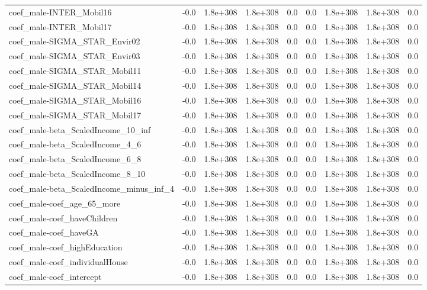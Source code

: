\begin{tabular}{lrrrrrrrr}
coef_male-INTER_Mobil16 & -0.0 & 1.8e+308 & 1.8e+308 & 0.0 & 0.0 & 1.8e+308 & 1.8e+308 & 0.0 \\
coef_male-INTER_Mobil17 & -0.0 & 1.8e+308 & 1.8e+308 & 0.0 & 0.0 & 1.8e+308 & 1.8e+308 & 0.0 \\
coef_male-SIGMA_STAR_Envir02 & -0.0 & 1.8e+308 & 1.8e+308 & 0.0 & 0.0 & 1.8e+308 & 1.8e+308 & 0.0 \\
coef_male-SIGMA_STAR_Envir03 & -0.0 & 1.8e+308 & 1.8e+308 & 0.0 & 0.0 & 1.8e+308 & 1.8e+308 & 0.0 \\
coef_male-SIGMA_STAR_Mobil11 & -0.0 & 1.8e+308 & 1.8e+308 & 0.0 & 0.0 & 1.8e+308 & 1.8e+308 & 0.0 \\
coef_male-SIGMA_STAR_Mobil14 & -0.0 & 1.8e+308 & 1.8e+308 & 0.0 & 0.0 & 1.8e+308 & 1.8e+308 & 0.0 \\
coef_male-SIGMA_STAR_Mobil16 & -0.0 & 1.8e+308 & 1.8e+308 & 0.0 & 0.0 & 1.8e+308 & 1.8e+308 & 0.0 \\
coef_male-SIGMA_STAR_Mobil17 & -0.0 & 1.8e+308 & 1.8e+308 & 0.0 & 0.0 & 1.8e+308 & 1.8e+308 & 0.0 \\
coef_male-beta_ScaledIncome_10_inf & -0.0 & 1.8e+308 & 1.8e+308 & 0.0 & 0.0 & 1.8e+308 & 1.8e+308 & 0.0 \\
coef_male-beta_ScaledIncome_4_6 & -0.0 & 1.8e+308 & 1.8e+308 & 0.0 & 0.0 & 1.8e+308 & 1.8e+308 & 0.0 \\
coef_male-beta_ScaledIncome_6_8 & -0.0 & 1.8e+308 & 1.8e+308 & 0.0 & 0.0 & 1.8e+308 & 1.8e+308 & 0.0 \\
coef_male-beta_ScaledIncome_8_10 & -0.0 & 1.8e+308 & 1.8e+308 & 0.0 & 0.0 & 1.8e+308 & 1.8e+308 & 0.0 \\
coef_male-beta_ScaledIncome_minus_inf_4 & -0.0 & 1.8e+308 & 1.8e+308 & 0.0 & 0.0 & 1.8e+308 & 1.8e+308 & 0.0 \\
coef_male-coef_age_65_more & -0.0 & 1.8e+308 & 1.8e+308 & 0.0 & 0.0 & 1.8e+308 & 1.8e+308 & 0.0 \\
coef_male-coef_haveChildren & -0.0 & 1.8e+308 & 1.8e+308 & 0.0 & 0.0 & 1.8e+308 & 1.8e+308 & 0.0 \\
coef_male-coef_haveGA & -0.0 & 1.8e+308 & 1.8e+308 & 0.0 & 0.0 & 1.8e+308 & 1.8e+308 & 0.0 \\
coef_male-coef_highEducation & -0.0 & 1.8e+308 & 1.8e+308 & 0.0 & 0.0 & 1.8e+308 & 1.8e+308 & 0.0 \\
coef_male-coef_individualHouse & -0.0 & 1.8e+308 & 1.8e+308 & 0.0 & 0.0 & 1.8e+308 & 1.8e+308 & 0.0 \\
coef_male-coef_intercept & -0.0 & 1.8e+308 & 1.8e+308 & 0.0 & 0.0 & 1.8e+308 & 1.8e+308 & 0.0 \\

\end{tabular}
